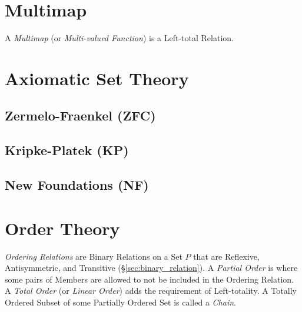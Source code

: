 \section{Multimap}\label{sec:multimap}

A \emph{Multimap} (or \emph{Multi-valued Function}) is a Left-total
Relation.



\section{Axiomatic Set Theory}\label{sec:axiomatic_set_theory}

\subsection{Zermelo-Fraenkel (ZFC)}\label{sec:zermelo_fraenkel}

\subsection{Kripke-Platek (KP)}\label{sec:kripke_platek}

\subsection{New Foundations (NF)}\label{sec:quine_foundations}



\section{Order Theory}\label{sec:order_theory}

\emph{Ordering Relations} are Binary Relations on a Set $P$ that are
Reflexive, Antisymmetric, and Transitive
(\S\ref{sec:binary_relation}). A \emph{Partial Order} is where some
pairs of Members are allowed to not be included in the Ordering
Relation. A \emph{Total Order} (or \emph{Linear Order}) adds the
requirement of Left-totality. A Totally Ordered Subset of some
Partially Ordered Set is called a \emph{Chain}.

